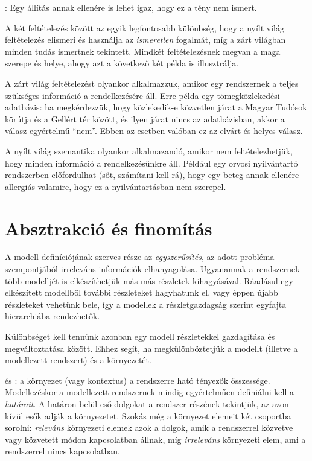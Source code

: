 \begin{definicio}
	: Egy állítás annak ellenére is lehet igaz, hogy ez a tény nem ismert.
\end{definicio}

A két feltételezés között az egyik legfontosabb különbség, hogy a nyílt világ feltételezés elismeri és használja az \emph{ismeretlen} fogalmát, míg a zárt világban minden tudás ismertnek tekintett. Mindkét feltételezésnek megvan a maga szerepe és helye, ahogy azt a következő két példa is illusztrálja.

\begin{pelda}
	A zárt világ feltételezést olyankor alkalmazzuk, amikor egy rendszernek a teljes szükséges információ a rendelkezésére áll. Erre példa egy tömegközlekedési adatbázis: ha megkérdezzük, hogy közlekedik-e közvetlen járat a Magyar Tudósok körútja és a Gellért tér között, és ilyen járat nincs az adatbázisban, akkor a válasz egyértelmű ``nem''. Ebben az esetben valóban ez az elvárt és helyes válasz.

	A nyílt világ szemantika olyankor alkalmazandó, amikor nem feltételezhetjük, hogy minden információ a rendelkezésünkre áll. Például egy orvosi nyilvántartó rendszerben előfordulhat (sőt, számítani kell rá), hogy egy beteg annak ellenére allergiás valamire, hogy ez a nyilvántartásban nem szerepel.
\end{pelda}

\section{Absztrakció és finomítás}

A modell definíciójának szerves része az \emph{egyszerűsítés}, az adott probléma szempontjából irreleváns információk elhanyagolása. Ugyanannak a rendszernek több modelljét is elkészíthetjük más-más részletek kihagyásával. Ráadásul egy elkészített modellből további részleteket hagyhatunk el, vagy éppen újabb részleteket vehetünk bele, így a modellek a részletgazdagság szerint egyfajta hierarchiába rendezhetők.

Különbséget kell tennünk azonban egy modell részletekkel gazdagítása és megváltoztatása között. Ehhez segít, ha megkülönböztetjük a modellt (illetve a modellezett rendszert) és a környezetét.

\begin{definicio}
	 és : a környezet (vagy kontextus) a rendszerre ható tényezők összessége. Modellezéskor a modellezett rendszernek mindig egyértelműen definiálni kell a \emph{határait}. A határon belül eső dolgokat a rendszer részének tekintjük, az azon kívül esők adják a környezetet. Szokás még a környezet elemeit két csoportba sorolni: \emph{releváns} környezeti elemek azok a dolgok, amik a rendszerrel közvetve vagy közvetett módon kapcsolatban állnak, míg \emph{irreleváns} környezeti elem, ami a rendszerrel nincs kapcsolatban.
\end{definicio}

